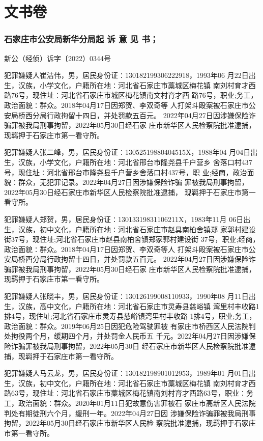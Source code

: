 \part{
    文书卷
}

\section{
    石家庄市公安局新华分局起 诉 意 见 书；
}
新公（经侦）诉字〔2022）0344号

犯罪嫌疑人崔洁伟，男，居民身份证∶130182199306222918，1993年06
月22日出生，汉族，小学文化，户籍所在地∶河北省石家庄市藁城区梅花镇
南刘村育才西路76号，现住址∶河北省石家庄市城区梅花镇南文村育才西
路76号，职业;务工，政治面貌∶群众。2018年04月17日因郑贺、李双奇等
人打架斗殴案被石家庄市公安局桥西分局行政拘留十四日，并处罚款五百元。
2022年04月27日因涉嫌保险诈骗罪被我局刑事拘留，2022年05月30日经石家
庄市新华区人民检察院批准逮捕，现羁押于石家庄市第一看守所。

犯罪嫌疑人张二峰，男，居民身份证∶13052519880404515X，1988年04
月04日出生，汉族，小学文化，户籍所在地∶河北省邢台市隆尧县千户营乡
舍落口村437号，现住址∶河北省邢台市隆尧县千户营乡舍落口村437号，职
业;经商，政治面貌∶群众，无犯罪记录。2022年04月27日因涉嫌保险诈骗
罪被我局刑事拘留，2022年05月30日经石家庄市新华区人民检察院批准逮捕，
现羁押于石家庄市第一看守所。

犯罪嫌疑人郑贺，男，居民身份证∶13013319831106211X，1983年11月
06日出生，汉族，初中文化，户籍所在地∶河北省石家庄市赵具南柏舍镇郑
家郭村建设街37号，现住址;河北省石家庄市赵县南柏舍镇郑家郭村建设街
37号，职业;经商，政治面貌∶群众。2018年04月17日因郑贺、李双奇等人
打架斗殴案被石家庄市公安局桥西分局行政拘留十四日，并处罚款五百元。
2022年04月27日因涉嫌保险诈骗罪被我局刑事拘留，2022年05月30日经石家
庄市新华区人民检察院批准逮捕，现羁押于石家庄市第一看守所。

犯罪嫌疑人张晓丰，男，居民身份证∶130126199008110933，1990年08
月11日出生，汉族，高中文化，户籍所在地∶河北省石家庄市灵寿县慈峪镇
湾里村丰收路1排4号，现住址;河北省石家庄市灵寿县慈峪镇湾里村丰收路
1排4号，职业;务工，政治面貌∶群众。2019年06月25日因犯危险驾驶罪被
有家庄市桥西区人民法院判处拘役两个月，缓期四个月，并处罚金人民币五
千元。2022年04月27日因涉嫌保险诈骗罪被我局刑事拘留，2022年05月30日
经石家庄市新华区人民检察院批准逮捕，现羁押于石家庄市第一看守所。

犯罪嫌疑人马云龙，男，居民身份证∶130182198901012953，1989年01
月01日出生，汉族，初中文化，户籍所在地∶河北省石家庄市藁城区梅花镇
南刘村育才西路63号，现住址∶河北省石家庄市藁城区梅花镇南刘村育才西路63号，职业∶务工，政治面貌∶群众。2020年01月11日犯故意伤害罪被石
家庄市高新区人民法院判处有期徒刑六个月，缓刑一年。2022年04月27日因
涉嫌保险诈骗罪被我局刑事拘留，2022年05月30日经石家庄市新华区人民检
察院批准逮捕，现羁押于石家庄市第一看守所。

